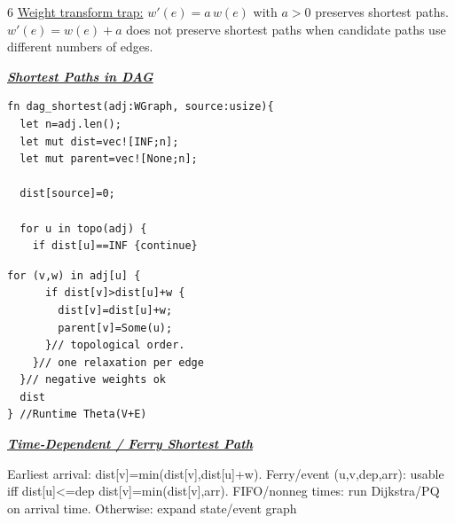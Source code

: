 \documentclass[a4paper,landscape]{article}
\renewcommand{\textbf}[1]{\underline{#1}}
\newcommand{\subsectionsize}{\fontsize{3.92}{4.02}\selectfont}
\newcommand{\subsectiontitle}[1]{%
  \par\vspace{0pt}%
  {\subsectionsize\bfseries\itshape\textbf{#1}}\par%
  \vspace{0pt}%
}
\begin{document}
\begin{multicols*}{6}
\textbf{Weight transform trap:} $w'(e)=a\,w(e)$ with $a>0$ preserves shortest paths. $w'(e)=w(e)+a$ does not preserve shortest paths when candidate paths use different numbers of edges.
\subsectiontitle{Shortest Paths in DAG}
\noindent
\begin{minipage}[t]{0.49\linewidth}\vspace{0pt}
\begin{lstlisting}[aboveskip=0pt,belowskip=0pt]
fn dag_shortest(adj:WGraph, source:usize){
  let n=adj.len();                          
  let mut dist=vec![INF;n];                 
  let mut parent=vec![None;n];

  dist[source]=0;

  for u in topo(adj) {
    if dist[u]==INF {continue}
\end{lstlisting}
\end{minipage}\hfill
\begin{minipage}[t]{0.49\linewidth}\vspace{0pt}
\begin{lstlisting}[aboveskip=0pt,belowskip=0pt]
    for (v,w) in adj[u] {    
      if dist[v]>dist[u]+w { 
        dist[v]=dist[u]+w;   
        parent[v]=Some(u);
      }// topological order.
    }// one relaxation per edge
  }// negative weights ok
  dist
} //Runtime Theta(V+E)
\end{lstlisting}
\end{minipage}

\subsectiontitle{Time-Dependent / Ferry Shortest Path}
Earliest arrival:
dist[v]=min(dist[v],dist[u]+w).
Ferry/event (u,v,dep,arr):
usable iff dist[u]<=dep
dist[v]=min(dist[v],arr).
FIFO/nonneg times:
run Dijkstra/PQ on arrival time.
Otherwise:
expand state/event graph


\end{multicols*}
\end{document}
